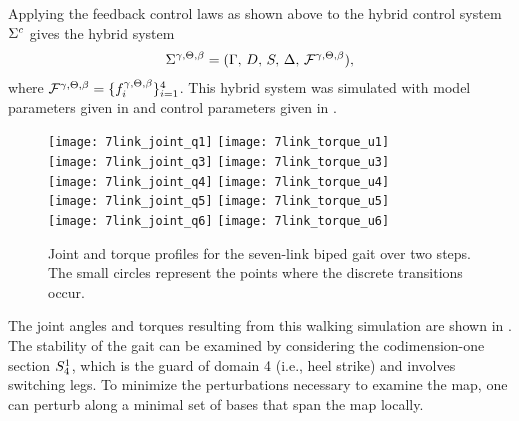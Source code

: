 Applying the feedback control laws as shown above to the hybrid control system
$\Sigma^{c}$ gives the hybrid system
\begin{align*}
  \Sigma^{\gamma, \Theta, \beta} = (\Gamma, \, D, \, S, \, \Delta, \,
  \mathcal{F}^{\gamma, \Theta, \beta}),
\end{align*}
where $\mathcal{F}^{\gamma, \Theta, \beta} = \{f_{i}^{\gamma, \Theta, \beta}\}_{i = 1}^{4}$.
%
This hybrid system was simulated with model parameters given in
 and control parameters given in
.
%
\begin{figure}[tp!]
  \centering
  \texttt{[image: 7link\_joint\_q1]}
  \texttt{[image: 7link\_torque\_u1]}\\
  \texttt{[image: 7link\_joint\_q3]}
  \texttt{[image: 7link\_torque\_u3]}\\
  \texttt{[image: 7link\_joint\_q4]}
  \texttt{[image: 7link\_torque\_u4]}\\
  \texttt{[image: 7link\_joint\_q5]}
  \texttt{[image: 7link\_torque\_u5]}\\
  \texttt{[image: 7link\_joint\_q6]}
  \texttt{[image: 7link\_torque\_u6]}
  \caption[Joint and torque profiles for the seven-link biped gait over two
  steps.]{Joint and torque profiles for the seven-link biped gait over two
    steps.
  The small circles represent the points where the discrete transitions occur.
  }
  \label{fig:7link-noes-angles}
\end{figure}
%
The joint angles and torques resulting from this walking simulation are shown in
.
%
The stability of the gait can be examined by considering the codimension-one
\Poincare{} section $S_{4}^{1}$, which is the guard of domain 4 (i.e., heel
strike) and involves switching legs.
%
To minimize the perturbations necessary to examine the \Poincare{} map, one can
perturb along a minimal set of bases that span the \Poincare{} map locally.

